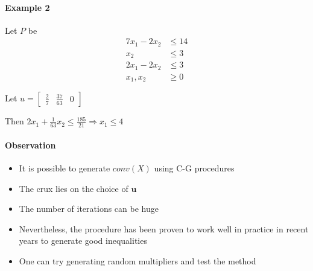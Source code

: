             \paragraph{Example 2}
                Let $P$ be
                \begin{align*}
                    7 x_1 - 2x_2 &\le 14\\
                    x_2 &\le 3\\
                    2 x_1 - 2x_2 &\le 3\\
                    x_1, x_2 &\ge 0
                \end{align*}

                Let $u = \begin{bmatrix}\frac{2}{7} & \frac{37}{63} & 0\end{bmatrix}$

                Then $2 x_1 + \frac{1}{63} x_2 \le \frac{185}{21} \Rightarrow x_1 \le 4$

            \paragraph{Observation}
                \begin{itemize}
                    \item It is possible to generate $conv(X)$ using C-G procedures
                    \item The crux lies on the choice of $\mathbf{u}$
                    \item The number of iterations can be huge
                    \item Nevertheless, the procedure has been proven to work well in practice in recent years to generate good inequalities
                    \item One can try generating random multipliers and test the method
                \end{itemize}

